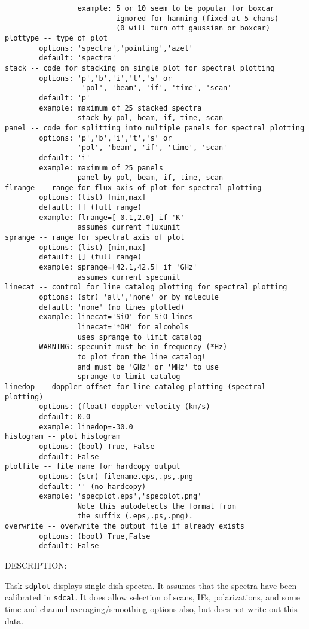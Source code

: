 \begin{verbatim}
                 example: 5 or 10 seem to be popular for boxcar
                          ignored for hanning (fixed at 5 chans)
                          (0 will turn off gaussian or boxcar)
plottype -- type of plot
        options: 'spectra','pointing','azel'
        default: 'spectra'
stack -- code for stacking on single plot for spectral plotting
        options: 'p','b','i','t','s' or
                  'pol', 'beam', 'if', 'time', 'scan'
        default: 'p'
        example: maximum of 25 stacked spectra
                 stack by pol, beam, if, time, scan
panel -- code for splitting into multiple panels for spectral plotting
        options: 'p','b','i','t','s' or
                 'pol', 'beam', 'if', 'time', 'scan'
        default: 'i'
        example: maximum of 25 panels
                 panel by pol, beam, if, time, scan
flrange -- range for flux axis of plot for spectral plotting
        options: (list) [min,max]
        default: [] (full range)
        example: flrange=[-0.1,2.0] if 'K'
                 assumes current fluxunit
sprange -- range for spectral axis of plot
        options: (list) [min,max]
        default: [] (full range)
        example: sprange=[42.1,42.5] if 'GHz'
                 assumes current specunit
linecat -- control for line catalog plotting for spectral plotting
        options: (str) 'all','none' or by molecule
        default: 'none' (no lines plotted)
        example: linecat='SiO' for SiO lines
                 linecat='*OH' for alcohols
                 uses sprange to limit catalog
        WARNING: specunit must be in frequency (*Hz)
                 to plot from the line catalog!
                 and must be 'GHz' or 'MHz' to use
                 sprange to limit catalog
linedop -- doppler offset for line catalog plotting (spectral plotting)
        options: (float) doppler velocity (km/s)
        default: 0.0
        example: linedop=-30.0
histogram -- plot histogram
        options: (bool) True, False
        default: False
plotfile -- file name for hardcopy output
        options: (str) filename.eps,.ps,.png
        default: '' (no hardcopy)
        example: 'specplot.eps','specplot.png'
                 Note this autodetects the format from
                 the suffix (.eps,.ps,.png).
overwrite -- overwrite the output file if already exists
        options: (bool) True,False
        default: False
\end{verbatim}
    DESCRIPTION:
    
    Task {\tt sdplot} displays single-dish spectra.  
    It assumes that the spectra have been calibrated in {\tt sdcal}.
    It does allow selection of scans, IFs, polarizations, and
    some time and channel averaging/smoothing options also,
    but does not write out this data.
    
